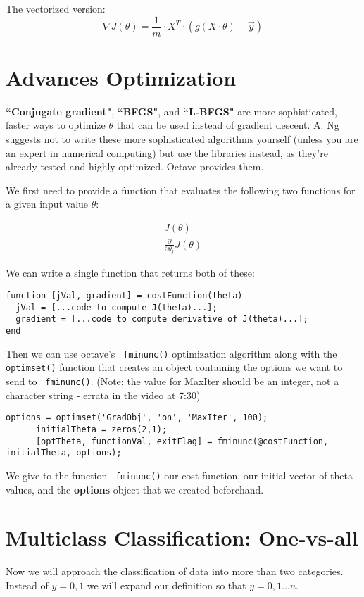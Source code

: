 The vectorized version:
\begin{equation}
\nabla J(\theta) = \frac{1}{m} \cdot X^T \cdot \left(g\left(X\cdot\theta\right) - \vec{y}\right)
\end{equation}

\section{Advances Optimization}
\textbf{``Conjugate gradient"}, \textbf{``BFGS"}, and \textbf{``L-BFGS"} are more sophisticated, faster ways to optimize $\theta$ that can be used instead of gradient descent. A. Ng suggests not to write these more sophisticated algorithms yourself (unless you are an expert in numerical computing) but use the libraries instead, as they're already tested and highly optimized. Octave provides them.

We first need to provide a function that evaluates the following two functions for a given input value $\theta$:

\begin{align*}
J(\theta)\\
\frac{\partial}{\partial\theta_j}J(\theta)
\end{align*}

We can write a single function that returns both of these:

\begin{verbatim}
function [jVal, gradient] = costFunction(theta)
  jVal = [...code to compute J(theta)...];
  gradient = [...code to compute derivative of J(theta)...];
end
\end{verbatim}

Then we can use octave's \verb| fminunc()| optimization algorithm along with the \verb|optimset()| function that creates an object containing the options we want to send to \verb| fminunc()|. (Note: the value for MaxIter should be an integer, not a character string - errata in the video at 7:30)

\begin{verbatim}
options = optimset('GradObj', 'on', 'MaxIter', 100);
      initialTheta = zeros(2,1);
      [optTheta, functionVal, exitFlag] = fminunc(@costFunction, initialTheta, options);
\end{verbatim}

We give to the function \verb| fminunc()| our cost function, our initial vector of theta values, and the \textbf{options} object that we created beforehand.

\section{Multiclass Classification: One-vs-all}
Now we will approach the classification of data into more than two categories. Instead of $y = {0,1}$ we will expand our definition so that $y = {0,1...n}$.

